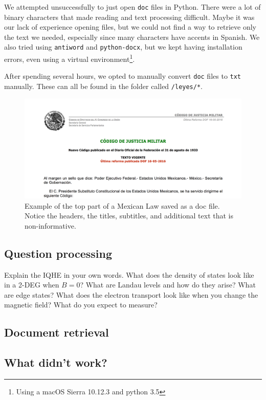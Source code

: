 \documentclass[letterpaper, margin=1in]{article}
\begin{document}
We attempted unsuccessfully to just open \texttt{doc} files in Python. There were a lot of binary characters that made reading and text processing difficult. Maybe it was our lack of experience opening files, but we could not find a way to retrieve only the text we needed, especially since many characters have accents in Spanish. We also tried using \texttt{antiword} and \texttt{python-docx}, but we kept having installation errors, even using a virtual environment\footnote{Using a macOS Sierra 10.12.3 and python 3.5}.

After spending several hours, we opted to manually convert \texttt{doc} files to \texttt{txt} manually. These can all be found in the folder called \texttt{/leyes/*}.

\begin{figure}
\centering
\includegraphics[width=1\textwidth]{header.png}
\caption{\label{fig:header}Example of the top part of a Mexican Law saved as a doc file. Notice the headers, the titles, subtitles, and additional text that is non-informative.}
\end{figure}

\subsection{Question processing}
Explain the IQHE in your own words. What does the density of states look like in a 2-DEG when $B=0$? What are Landau levels and how do they arise? What are edge states? What does the electron transport look like when you change the magnetic field? What do you expect to measure?

\subsection{Document retrieval}


\subsection{What didn't work?}
\end{document}
